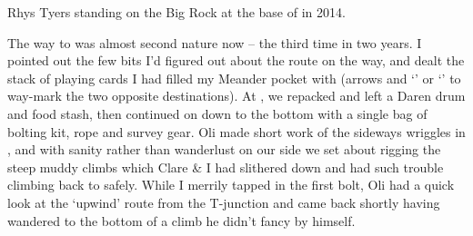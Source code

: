 \begin{marginfigure}
\checkoddpage \ifoddpage \forcerectofloat \else \forceversofloat \fi
\centering
 \caption{Rhys Tyers standing on the Big Rock at the base of  in 2014. }
 \label{the big rock}
\end{marginfigure}

The way to  was almost second nature now -- the third time in two
years. I pointed out the few bits I'd figured out about the route on the
way, and dealt the stack of playing cards I had filled my Meander pocket
with (arrows and `' or `' to way-mark the two opposite
destinations). At , we repacked and left a Daren drum and food
stash, then continued on down to the bottom with a single bag of bolting
kit, rope and survey gear. Oli made short work of the sideways wriggles
in , and with sanity rather than wanderlust on our
side we set about rigging the steep muddy climbs which Clare \& I had
slithered down and had such trouble climbing back to safely. While I merrily tapped in
the first bolt, Oli had a quick look at the `upwind' route from the
T-junction and came back shortly having wandered to the bottom of a
climb he didn't fancy by himself.

